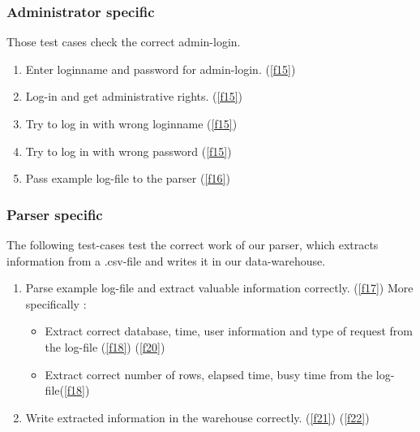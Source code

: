\subsubsection{Administrator specific}

Those test cases check the correct admin-login.

\begin{enumerate}

\item Enter loginname and password for admin-login. (\ref{f15})

\item Log-in and get administrative rights. (\ref{f15})

\item Try to log in with wrong loginname (\ref{f15})

\item Try to log in with wrong password (\ref{f15})

\item Pass example log-file to the parser (\ref{f16})

\end{enumerate}

\subsubsection{Parser specific}

The following test-cases test the correct work of our parser, which extracts information from a .csv-file and writes 
it in our data-warehouse.

\begin{enumerate}

\item Parse example log-file and extract valuable information correctly. (\ref{f17}) More specifically :

\begin{itemize}

\item Extract correct database, time, user information and type of request from the log-file (\ref{f18}) (\ref{f20})

\item Extract correct number of rows, elapsed time, busy time from the log-file(\ref{f18})

\end{itemize}

\item Write extracted information in the warehouse correctly. (\ref{f21}) (\ref{f22})

\end{enumerate}


